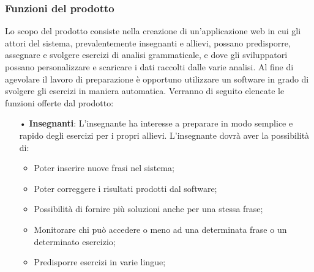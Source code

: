 \subsubsection{Funzioni del prodotto}
Lo scopo del prodotto consiste nella creazione di un'applicazione web in cui gli attori del sistema, prevalentemente insegnanti e allievi, possano predisporre, assegnare e svolgere esercizi di analisi grammaticale, e dove gli sviluppatori possano personalizzare e scaricare i dati raccolti dalle varie analisi.
Al fine di agevolare il lavoro di preparazione è opportuno utilizzare un software in grado di svolgere gli esercizi in maniera automatica.
Verranno di seguito elencate le funzioni offerte dal prodotto:
\begin{itemize}
\item[•]\textbf{Insegnanti}:
L'insegnante ha interesse a preparare in modo semplice e rapido degli esercizi per i propri allievi.
L'insegnante dovrà aver la possibilità di:
\begin{itemize}
\item Poter inserire nuove frasi nel sistema;
\item Poter correggere i risultati prodotti dal software;
\item Possibilità di fornire più soluzioni anche per una stessa frase;
\item Monitorare chi può accedere o meno ad una determinata frase o un determinato esercizio;
\item Predisporre esercizi in varie lingue;
\end{itemize}


\end{itemize}
